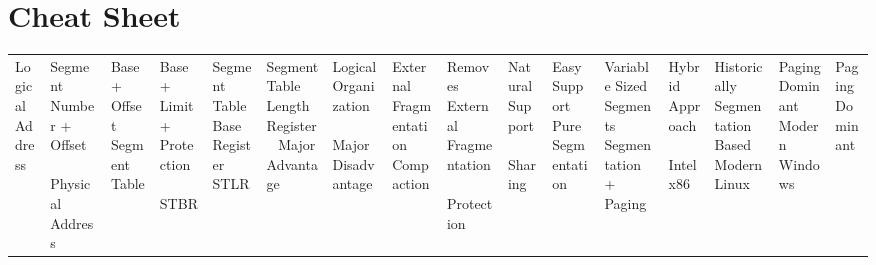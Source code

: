 \section{Cheat Sheet}

\begin{center}
\begin{tabular}{|p{5cm}|p{8cm}|}
\hline
Logical Address & Segment Number + Offset \
\hline
Physical Address & Base + Offset \
\hline
Segment Table & Base + Limit + Protection \
\hline
STBR & Segment Table Base Register \
\hline
STLR & Segment Table Length Register \
\hline
Major Advantage & Logical Organization \
\hline
Major Disadvantage & External Fragmentation \
\hline
Compaction & Removes External Fragmentation \
\hline
Protection & Natural Support \
\hline
Sharing & Easy Support \
\hline
Pure Segmentation & Variable Sized Segments \
\hline
Segmentation + Paging & Hybrid Approach \
\hline
Intel x86 & Historically Segmentation Based \
\hline
Modern Linux & Paging Dominant \
\hline
Modern Windows & Paging Dominant \
\hline
\end{tabular}
\end{center}
